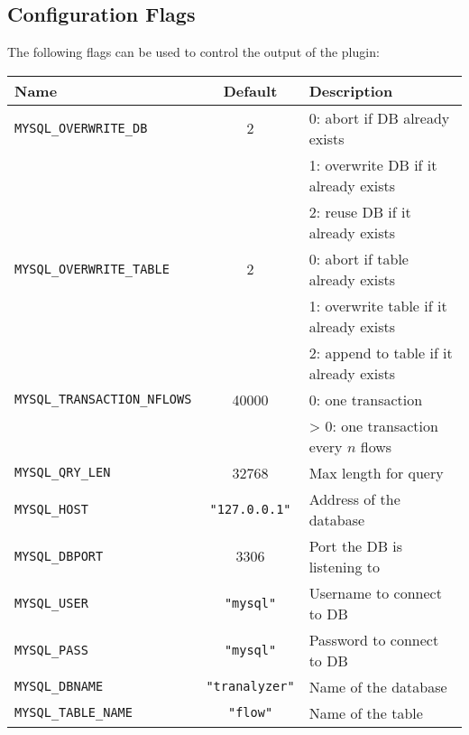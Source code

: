 \documentclass[documentation]{subfiles}
\begin{document}
\subsection{Configuration Flags}
The following flags can be used to control the output of the plugin:
\begin{longtable}{lcl}
    \toprule
    {\bf Name} & {\bf Default} & {\bf Description}\\
    \midrule\endhead%
    {\tt MYSQL\_OVERWRITE\_DB}       & 2                  & 0: abort if DB already exists\\
                                     &                    & 1: overwrite DB if it already exists\\
                                     &                    & 2: reuse DB if it already exists\\
    {\tt MYSQL\_OVERWRITE\_TABLE}    & 2                  & 0: abort if table already exists\\
                                     &                    & 1: overwrite table if it already exists\\
                                     &                    & 2: append to table if it already exists\\
    {\tt MYSQL\_TRANSACTION\_NFLOWS} & 40000              & 0: one transaction\\
                                     &                    & > 0: one transaction every $n$ flows\\
    {\tt MYSQL\_QRY\_LEN}            & 32768              & Max length for query\\
    {\tt MYSQL\_HOST}                & {\tt "127.0.0.1"}  & Address of the database\\
    {\tt MYSQL\_DBPORT}              & 3306               & Port the DB is listening to\\
    {\tt MYSQL\_USER}                & {\tt "mysql"}      & Username to connect to DB\\
    {\tt MYSQL\_PASS}                & {\tt "mysql"}      & Password to connect to DB\\
    {\tt MYSQL\_DBNAME}              & {\tt "tranalyzer"} & Name of the database\\
    {\tt MYSQL\_TABLE\_NAME}         & {\tt "flow"}       & Name of the table\\
    \bottomrule
\end{longtable}
\end{document}
